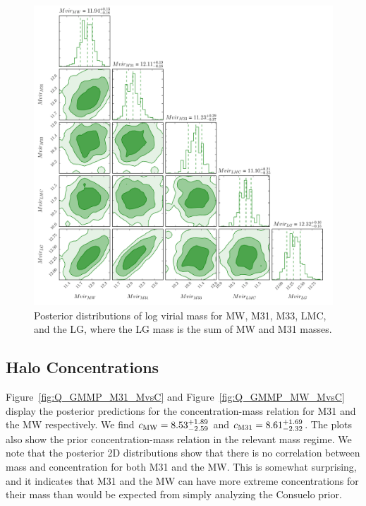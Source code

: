 \documentclass[iop,apj,twocolappendix,numberedappendix]{emulateapj}
\newcommand{\consuelo}{{\sc Consuelo }}
\def\Fref#1{Figure~\ref{#1}}
\def\CMEI{c_{\rm M31}}
\def\CMW{c_{\rm MW}}
\def\CMWestimate{8.53}
\def\CMWerrorplus{1.89}
\def\CMWerrorminus{2.59}
\def\CMEIestimate{8.61}
\def\CMEIerrorplus{1.69}
\def\CMEIerrorminus{2.32}
\begin{document}
\begin{figure}[ht]
\includegraphics[width=\linewidth]{figures/Q_GMMP_all_Mvir.pdf}
\caption{Posterior distributions of log virial mass for MW, M31, M33, LMC, and the LG, where the LG mass is the sum of MW and M31 masses.}
\label{fig:Q_GMMP_all_Mvir}
\end{figure}


\subsection{Halo Concentrations}
\label{sec:conc}
\Fref{fig:Q_GMMP_M31_MvsC} and \Fref{fig:Q_GMMP_MW_MvsC} display the posterior predictions for the concentration-mass relation for M31 and the MW respectively. 
We find 
$\CMW = \CMWestimate^{+\CMWerrorplus}_{-\CMWerrorminus}$ and 
$\CMEI = \CMEIestimate^{+\CMEIerrorplus}_{-\CMEIerrorminus}$. 
The plots also show the prior concentration-mass relation in the relevant mass regime. We note that the posterior 2D distributions show that there is no correlation between mass and concentration for both M31 and the MW. 
This is somewhat surprising, and it indicates that M31 and the MW can have more extreme concentrations for their mass than would be expected from simply analyzing the \consuelo prior.
\end{document}
